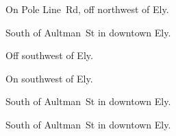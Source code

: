 

\begin{LocationList}

On Pole Line~Rd, off  northwest of Ely.

South of   Aultman~St in downtown Ely.

Off  southwest of Ely.

\Location{\GasStation \Gas}
On  southwest of Ely.

South of   Aultman~St in downtown Ely.

\Location{\RestArea \Rest}
South of   Aultman~St in downtown Ely.

\end{LocationList}
